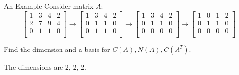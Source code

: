 \documentclass{beamer}
\begin{document}
\begin{frame}{An Example}
Consider matrix $A$:
\begin{equation*}
    \left[ \begin{matrix}
        1&		3&		4&		2\\
        2&		7&		9&		4\\
        0&		1&		1&		0\\
    \end{matrix} \right] \rightarrow \left[ \begin{matrix}
        1&		3&		4&		2\\
        0&		1&		1&		0\\
        0&		1&		1&		0\\
    \end{matrix} \right] \rightarrow \left[ \begin{matrix}
        1&		3&		4&		2\\
        0&		1&		1&		0\\
        0&		0&		0&		0\\
    \end{matrix} \right] \rightarrow \left[ \begin{matrix}
        1&		0&		1&		2\\
        0&		1&		1&		0\\
        0&		0&		0&		0\\
    \end{matrix} \right]
\end{equation*}

Find the dimension and a basis for $C(A), N(A), C(A^T)$.

\vspace{3pt}
The dimensions are 2, 2, 2.


\end{frame}
\end{document}
